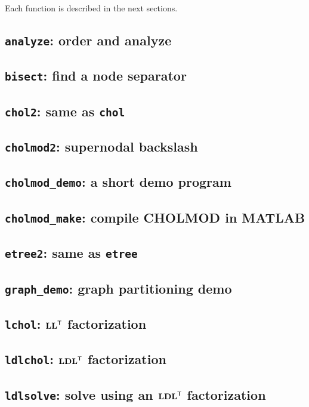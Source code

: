 \documentclass[11pt]{article}
\newcommand{\m}[1]{{\bf{#1}}}       %
\newcommand{\tr}{^{\sf T}}          %
\begin{document}
\vspace{0.1in}\noindent
Each function is described in the next sections.

\newpage
\subsection{{\tt analyze}: order and analyze}					
\subsection{{\tt bisect}: find a node separator}				
\subsection{{\tt chol2}: same as {\tt chol}}					
\newpage
\subsection{{\tt cholmod2}: supernodal backslash}				
\newpage
\subsection{{\tt cholmod\_demo}: a short demo program}				
\subsection{{\tt cholmod\_make}: compile CHOLMOD in MATLAB}			
\newpage
\subsection{{\tt etree2}: same as {\tt etree}}					
\subsection{{\tt graph\_demo}: graph partitioning demo}				
\newpage
\subsection{{\tt lchol}: $\m{LL}\tr$ factorization}				
\subsection{{\tt ldlchol}: $\m{LDL}\tr$ factorization}				
\newpage
\subsection{{\tt ldlsolve}: solve using an $\m{LDL}\tr$ factorization}		
\end{document}
